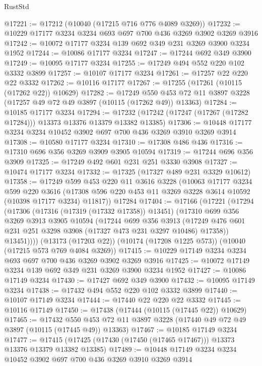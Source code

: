 \begin{lexlean}{RustStd}
\begin{coremodule}
@17221 := @17212 (@10040 (@17215 @716 @776 @4089 @3269))
@17232 := @10229 @17177 @3234 @3234 @693 @697 @700 @436 @3269 @3902 @3269 @3916
@17242 := @10072 @17177 @3234 @139 @692 @349 @231 @3269 @3900 @3234 @1952
@17244 := @10086 @17177 @3234
@17247 := @17244 @692 @349 @3900
@17249 := @10095 @17177 @3234
@17255 := @17249 @494 @552 @220 @102 @3332 @3899
@17257 := @10107 @17177 @3234
@17261 := @17257 @22 @220 @22 @3332
@17262 := @10116 @17177
@17267 := @17255 (@17261 (@10115 (@17262 @22)) @10629)
@17282 := @17249
    @550
    @453
    @72
    @11
    @3897
    @3228
    (@17257 @49 @72 @49 @3897 (@10115 (@17262 @49)) @13363)
@17284 := @10185 @17177 @3234
@17294 := @17232 (@17242 (@17247 (@17267 (@17282 @17284))) @13373 @13376 @13379 @13382 @13385)
@17306 := @10448 @17177 @3234 @3234 @10452 @3902 @697 @700 @436 @3269 @3910 @3269 @3914
@17308 := @10580 @17177 @3234
@17310 := @17308 @486 @436
@17316 := @17310 @696 @356 @3269 @3909 @3905 @10594
@17319 := @17244 @696 @356 @3909
@17325 := @17249 @492 @601 @231 @251 @3330 @3908
@17327 := @10474 @17177 @3234
@17332 := @17325 (@17327 @489 @231 @3329 @10612)
@17358 := @17249
    @599
    @453
    @220
    @11
    @3616
    @3228
    (@10063
      @17177
      @3234
      @599
      @220
      @3616
      (@17308 @596 @220 @453 @11 @3269 @3228 @3614 @10592 (@10398 @17177 @3234) @11817))
    @17284
@17404 := @17166
    (@17221
      (@17294
        (@17306
          (@17316 (@17319 (@17332 @17358)) @13451)
          (@17310
            @699
            @356
            @3269
            @3913
            @3905
            @10594
            (@17244
              @699
              @356
              @3913
              (@17249 @476 @601 @231 @251 @3298 @3908 (@17327 @473 @231 @3297 @10486) @17358))
            @13451))))
    (@13173 (@17203 @22))
    (@10174 (@17208 @1225 @573))
    (@10040 (@17215 @573 @769 @4084 @3269))
@17415 := @10229 @17149 @3234 @3234 @693 @697 @700 @436 @3269 @3902 @3269 @3916
@17425 := @10072 @17149 @3234 @139 @692 @349 @231 @3269 @3900 @3234 @1952
@17427 := @10086 @17149 @3234
@17430 := @17427 @692 @349 @3900
@17432 := @10095 @17149 @3234
@17438 := @17432 @494 @552 @220 @102 @3332 @3899
@17440 := @10107 @17149 @3234
@17444 := @17440 @22 @220 @22 @3332
@17445 := @10116 @17149
@17450 := @17438 (@17444 (@10115 (@17445 @22)) @10629)
@17465 := @17432
    @550
    @453
    @72
    @11
    @3897
    @3228
    (@17440 @49 @72 @49 @3897 (@10115 (@17445 @49)) @13363)
@17467 := @10185 @17149 @3234
@17477 := @17415 (@17425 (@17430 (@17450 (@17465 @17467))) @13373 @13376 @13379 @13382 @13385)
@17489 := @10448 @17149 @3234 @3234 @10452 @3902 @697 @700 @436 @3269 @3910 @3269 @3914

\end{coremodule}
\end{lexlean}
